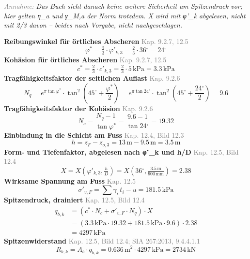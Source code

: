 \documentclass[11pt,a4paper]{article}
\newcommand{\normref}[1]{{\small\textcolor{gray}{#1}}}
\newcommand{\hinweis}[2]{\par\noindent\textcolor{gray}{\textit{#1:}} \textit{#2}\par}
\begin{document}
\hinweis{Annahme}{Das Buch sieht danach keine weitere Sicherheit am Spitzendruck vor; hier gelten η\_a und γ\_M,a der Norm trotzdem. X wird mit φ'\_k abgelesen, nicht mit 2/3 davon -- beides nach Vorgabe, nicht nachgeschlagen.}
\noindent\textbf{Reibungswinkel für örtliches Abscheren} \hfill \normref{Kap. 9.2.7, 12.5}
\begin{equation*}
\varphi^{*} = \tfrac{2}{3} \cdot \varphi'_{k,3} = \tfrac{2}{3} \cdot 36{}^{\circ} = 24{}^{\circ}
\end{equation*}
\noindent\textbf{Kohäsion für örtliches Abscheren} \hfill \normref{Kap. 9.2.7, 12.5}
\begin{equation*}
c^{*} = \tfrac{2}{3} \cdot c'_{k,3} = \tfrac{2}{3} \cdot 5\,\mathrm{kPa} = 3.3\,\mathrm{kPa}
\end{equation*}
\noindent\textbf{Tragfähigkeitsfaktor der seitlichen Auflast} \hfill \normref{Kap. 9.2.6}
\begin{equation*}
N_q = e^{\pi \tan \varphi^{*}} \cdot \tan^{2}\left(45^\circ + \frac{\varphi^{*}}{2}\right) = e^{\pi \tan 24{}^{\circ}} \cdot \tan^{2}\left(45^\circ + \frac{24{}^{\circ}}{2}\right) = 9.6
\end{equation*}
\noindent\textbf{Tragfähigkeitsfaktor der Kohäsion} \hfill \normref{Kap. 9.2.6}
\begin{equation*}
N_c = \frac{N_q - 1}{\tan \varphi^{*}} = \frac{9.6 - 1}{\tan 24{}^{\circ}} = 19.32
\end{equation*}
\noindent\textbf{Einbindung in die Schicht am Fuss} \hfill \normref{Kap. 12.4, Bild 12.3}
\begin{equation*}
h = z_F - z_{o,3} = 13\,\mathrm{m} - 9.5\,\mathrm{m} = 3.5\,\mathrm{m}
\end{equation*}
\noindent\textbf{Form- und Tiefenfaktor, abgelesen nach φ'\_k und h/D} \hfill \normref{Kap. 12.5, Bild 12.4}
\begin{equation*}
X = X\left(\varphi'_{k,3}, \tfrac{h}{D}\right) = X\left(36{}^{\circ}, \tfrac{3.5\,\mathrm{m}}{900\,\mathrm{mm}}\right) = 2.38
\end{equation*}
\noindent\textbf{Wirksame Spannung am Fuss} \hfill \normref{Kap. 12.5}
\begin{equation*}
\sigma'_{v,F} = \sum \gamma_i \, t_i - u = 181.5\,\mathrm{kPa}
\end{equation*}
\noindent\textbf{Spitzendruck, drainiert} \hfill \normref{Kap. 12.5, Bild 12.4}
\begin{equation*}
\begin{aligned}
  q_{b,k} &= \left(c^{*} \cdot N_c + \sigma'_{v,F} \cdot N_q\right) \cdot X \\
  &= \left(3.3\,\mathrm{kPa} \cdot 19.32 + 181.5\,\mathrm{kPa} \cdot 9.6\right) \cdot 2.38 \\
  &= 4297\,\mathrm{kPa}
\end{aligned}
\end{equation*}
\noindent\textbf{Spitzenwiderstand} \hfill \normref{Kap. 12.5, Bild 12.4; SIA 267:2013, 9.4.4.1.1}
\begin{equation*}
R_{b,k} = A_b \cdot q_{b,k} = 0.636\,\mathrm{m}^{2} \cdot 4297\,\mathrm{kPa} = 2734\,\mathrm{kN}
\end{equation*}
\end{document}

